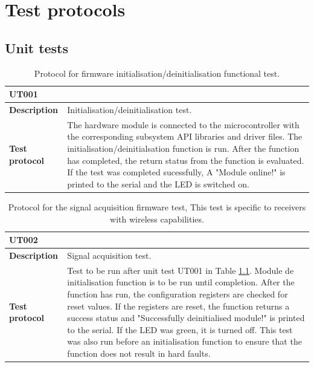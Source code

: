 \chapter{Test protocols}

\section{Unit tests}
\label{app:Unittests}
\begin{table}[H]
	\centering
	\setlength{\extrarowheight}{5pt}
	\caption{ Protocol for firmware initialisation/deinitialisation functional test.}
	\label{tab:UT001}
	\begin{tabular}{m{} m{}}
		\multicolumn{2}{l}{\textbf{UT001} }\\
		\hline
		\textbf{Description} & Initialisation/deinitialisation test.\\
		\hline
		\hline
		\textbf{Test protocol} & The hardware module is connected to the microcontroller with the corresponding subsystem API libraries and driver files. The initialisation/deinitialsation function is run. After the function has completed, the return status from the function is evaluated. If the test was completed sucessfully, A "Module online!" is printed to the serial and the LED is switched on. \\
		\hline
		\hline
	\end{tabular}
\end{table}

\begin{table}[H]
	\centering
	\caption{Protocol for the signal acquisition firmware test, This test is specific to receivers with wireless capabilities. }
	\setlength{\extrarowheight}{5pt}
	\label{tab:UT002}
	\begin{tabular}{m{} m{}}
		\multicolumn{2}{l}{\textbf{UT002} }\\
		\hline
		\textbf{Description} & Signal acquisition test.\\
		\hline
		\hline
		\textbf{Test protocol} & Test to be run after unit test UT001 in Table \ref{tab:UT001}. Module de initialisation function is to be run until completion. After the function has run, the configuration registers are checked for reset values. If the registers are reset, the function returns a success status and "Successfully deinitialised module!" is printed to the serial. If the LED was green, it is turned off. This test was also run before an initialisation function to ensure that the function does not result in hard faults.\\
		\hline
		\hline
	\end{tabular}
\end{table}

